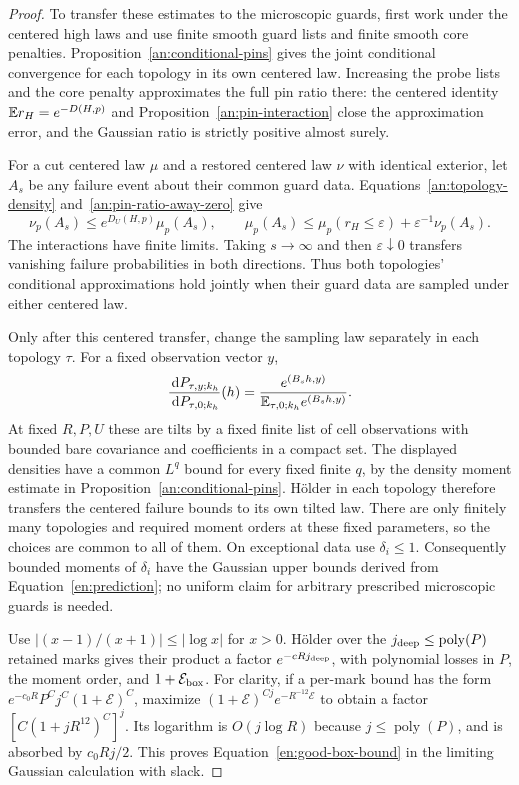 \begin{proof}
To transfer these estimates to the microscopic guards, first work
under the centered high laws and use finite smooth guard lists and
finite smooth core penalties.  Proposition~\ref{an:conditional-pins}
gives the joint conditional convergence for each topology in its
own centered law.  Increasing the probe lists and the core penalty
approximates the full pin ratio there: the centered identity
$\mathbb E r_H=e^{-D(H,p)}$ and Proposition~\ref{an:pin-interaction}
close the approximation error, and the Gaussian ratio is strictly
positive almost surely.

For a cut centered law $\mu$ and a restored centered law $\nu$
with identical exterior, let $A_s$ be any failure event about their
common guard data.  Equations~\eqref{an:topology-density}
and~\eqref{an:pin-ratio-away-zero} give
\[
 \nu_p(A_s)\le e^{D_U(H,p)}\mu_p(A_s),\qquad
 \mu_p(A_s)\le\mu_p(r_H\le\varepsilon)
                    +\varepsilon^{-1}\nu_p(A_s).
\]
The interactions have finite limits.  Taking $s\to\infty$ and
then $\varepsilon\downarrow0$ transfers vanishing failure
probabilities in both directions.  Thus both topologies'
conditional approximations hold jointly when their guard data are
sampled under either centered law.

Only after this centered transfer, change the sampling law separately
in each topology $\tau$.  For a fixed observation vector $y$,
\[
 \frac{\,\mathrm d P_{\tau,y;k_h}}{\,\mathrm d P_{\tau,0;k_h}}(h)
 =\frac{e^{(B_sh,y)}}{\mathbb E_{\tau,0;k_h}e^{(B_sh,y)}} .
\]
At fixed $R,P,U$ these are tilts by a fixed finite list of cell
observations with bounded bare covariance and coefficients in a
compact set.  The displayed densities have a common $L^q$ bound
for every fixed finite $q$, by the density moment estimate in
Proposition~\ref{an:conditional-pins}.  H\"older in each topology
therefore transfers the centered failure bounds to its own tilted
law.  There are only finitely many topologies and required moment
orders at these fixed parameters, so the choices are common to all
of them.  On exceptional data use $\delta_i\leq1$.
Consequently bounded moments of $\delta_i$ have the Gaussian upper
bounds derived from Equation~\eqref{en:prediction}; no uniform claim
for arbitrary prescribed microscopic guards is needed.

Use $|(x-1)/(x+1)|\leq|\log x|$ for $x>0$.  H\"older over the
$j_{\rm deep}\leq\operatorname{poly}(P)$ retained marks gives their
product a factor $e^{-cRj_{\rm deep}}$, with polynomial losses in
$P$, the moment order, and $1+\mathcal E_{\rm box}$.  For clarity,
if a per-mark bound has the form
$e^{-c_0R}P^Cj^C(1+\mathcal E)^C$, maximize
$(1+\mathcal E)^{Cj}e^{-R^{-12}\mathcal E}$ to obtain a factor
$[C(1+jR^{12})^C]^j$.  Its logarithm is $O(j\log R)$ because
$j\leq\operatorname{poly}(P)$, and is absorbed by $c_0Rj/2$.
This proves Equation~\eqref{en:good-box-bound} in the limiting
Gaussian calculation with slack.


\end{proof}
